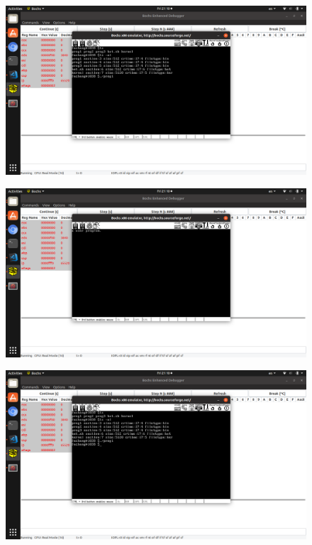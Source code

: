 \documentclass[a4paper,11pt,UTF8]{ctexart}
\newcommand{\bottomcaption}{%
\setlength{\abovecaptionskip}{6pt}%
\setlength{\belowcaptionskip}{6pt}%
\caption}
\newcommand{\xiaowuhao}{\fontsize{9pt}{\baselineskip}\selectfont}   %
\begin{document}
  \begin{figure}[!htbp]
    \centering
    \includegraphics[width=\textwidth]{imgs/Screenshot_from_2019-03-29_21-10-28.png}
    \bottomcaption{\xiaowuhao{输入ls以及ls -al指令之后，显示了文件名及详情信息}}
  \end{figure}
  \begin{figure}[!htbp]
    \centering
    \includegraphics[width=\textwidth]{imgs/Screenshot_from_2019-03-29_21-10-31.png}
    \bottomcaption{\xiaowuhao{输入"./prog1之后，程序运行在新的窗口"，可以}}
  \end{figure}
  \begin{figure}[!htbp]
    \centering
    \includegraphics[width=\textwidth]{imgs/Screenshot_from_2019-03-29_21-10-37.png}
    \bottomcaption{\xiaowuhao{用户程序1按回车之后，回到了主界面}}
  \end{figure}
\end{document}
